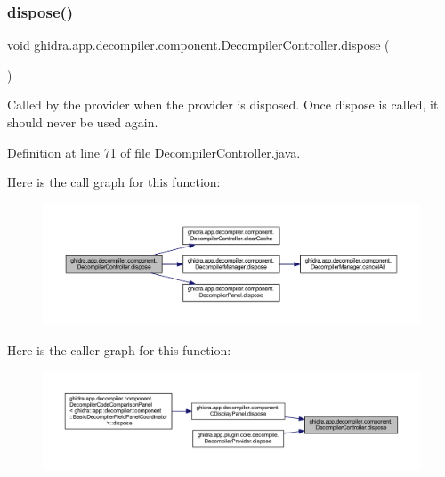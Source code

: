 \subsubsection{\texorpdfstring{dispose()}{dispose()}}
{\footnotesize\ttfamily void ghidra.\+app.\+decompiler.\+component.\+Decompiler\+Controller.\+dispose (\begin{DoxyParamCaption}{ }\end{DoxyParamCaption})\hspace{0.3cm}{\ttfamily [inline]}}

Called by the provider when the provider is disposed. Once dispose is called, it should never be used again. 

Definition at line 71 of file Decompiler\+Controller.\+java.

Here is the call graph for this function\+:
\nopagebreak
\begin{figure}[H]
\begin{center}
\leavevmode
\includegraphics[width=350pt]{classghidra_1_1app_1_1decompiler_1_1component_1_1_decompiler_controller_a630ed5b31dfc58f308580a98ca63fc65_cgraph}
\end{center}
\end{figure}
Here is the caller graph for this function\+:
\nopagebreak
\begin{figure}[H]
\begin{center}
\leavevmode
\includegraphics[width=350pt]{classghidra_1_1app_1_1decompiler_1_1component_1_1_decompiler_controller_a630ed5b31dfc58f308580a98ca63fc65_icgraph}
\end{center}
\end{figure}
\mbox{\label{classghidra_1_1app_1_1decompiler_1_1component_1_1_decompiler_controller_a44c803e49982c114b829c62bd114b7d7}} 
